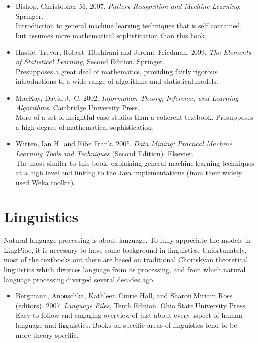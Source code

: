 \begin{itemize}
\item
Bishop, Christopher M.
2007.
{\it Pattern Recognition and Machine Learning}.
Springer.
\\
{\footnotesize Introduction to general machine learning
techniques that is self contained, but assumes more mathematical
sophistication than this book.}
%
\item
Hastie, Trevor, Robert Tibshirani and Jerome Friedman.
2009.
{\it The Elements of Statistical Learning}, Second Edition.
Springer.
\\
{\footnotesize Presupposes a great deal of mathematics, providing
fairly rigorous introductions to a wide range of algorithms and
statistical models.}
%
\item
MacKay, David J.~C.
2002.
{\it Information Theory, Inference, and Learning Algorithms}.
Cambridge University Press.
\\
{\footnotesize More of a set of insightful case studies than a coherent textbook.
Presupposes a high degree of mathematical sophistication.}
%
\item 
Witten, Ian H.\ and Eibe Frank. 2005. {\it Data Mining: Practical
Machine Learning Tools and Techniques} (Second Edition).  Elsevier.
\\
{\footnotesize The most similar to this book, explaining general machine
learning techniques at a high level and 
linking to the Java implementations (from their widely used Weka toolkit).}
%
\end{itemize}




\section{Linguistics}

\noindent
Natural language processing is about language.  To fully appreciate
the models in LingPipe, it is necessary to have some background in
linguistics.  Unfortunately, most of the textbooks out there are based
on traditional Chomskyan theoretical linguistics which divorces
language from its processing, and from which natural language
processing diverged several decades ago.

\begin{itemize}
%
\item Bergmann, Anouschka, Kathleen Currie Hall, and Sharon Miriam Ross (editors).
2007.
{\it Language Files}, Tenth Edition.
Ohio State University Press.
\\
{\footnotesize Easy to follow and engaging overview of just about every
aspect of human language and linguistics.  Books on specific areas of
linguistics tend to be more theory specific.}
%
\end{itemize}



